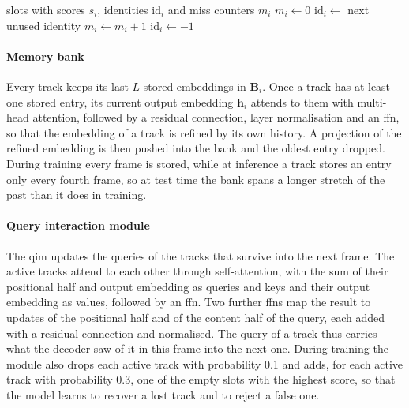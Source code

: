 \begin{algorithm}[htbp]
    \caption{Track birth and death at inference}
    \label{alg:design-lifecycle}
    \begin{algorithmic}[1]
        \Require slots with scores $s_i$, identities $\mathrm{id}_i$ and miss counters $m_i$
                \State $m_i \gets 0$ 
            \EndIf
                \State $\mathrm{id}_i \gets$ next unused identity 
                \State $m_i \gets m_i + 1$
                    \State $\mathrm{id}_i \gets -1$ 
                \EndIf
            \EndIf
        \EndFor
    \end{algorithmic}
\end{algorithm}


\paragraph{Memory bank}
Every track keeps its last $L$ stored embeddings in $\mathbf{B}_i$. Once a track has at least one stored
entry, its current output embedding $\mathbf{h}_i$ attends to them with multi-head attention, followed by a
residual connection, layer normalisation and an \ac{ffn}, so that the embedding of a track is refined by its
own history. A projection of the refined embedding is then pushed into the bank and the oldest entry dropped.
During training every frame is stored, while at inference a track stores an entry only every fourth frame,
so at test time the bank spans a longer stretch of the past than it does in training.

\paragraph{Query interaction module}
The \ac{qim} updates the queries of the tracks that survive into the next frame. The active tracks attend to
each other through self-attention, with the sum of their positional half and output embedding as queries
and keys and their output embedding as values, followed by an \ac{ffn}. Two further \acp{ffn} map the result
to updates of the positional half and of the content half of the query, each added with a residual
connection and normalised. The query of a track thus carries what the decoder saw of it in this frame into
the next one. During training the module also drops each active track with probability 0.1 and adds, for
each active track with probability 0.3, one of the empty slots with the highest score, so that the model
learns to recover a lost track and to reject a false one.


